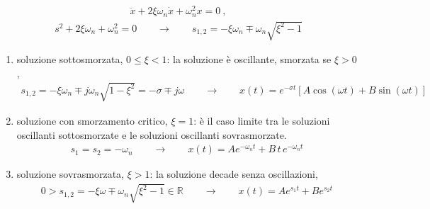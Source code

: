 \documentclass[letterpaper,10pt,italian]{jupyterBook}
\begin{document}
\begin{equation*}
\begin{split}\ddot{x} + 2 \xi \omega_n \dot{x} + \omega_n^2 x = 0 \ ,\end{split}
\end{equation*}\begin{equation*}
\begin{split}s^2 + 2 \xi \omega_n + \omega_n^2 = 0 \qquad \rightarrow \qquad s_{1,2} = -\xi \omega_n \mp \omega_n \sqrt{\xi^2 - 1}\end{split}
\end{equation*}\begin{enumerate}
%
\item {} 
\sphinxAtStartPar
soluzione sotto\sphinxhyphen{}smorzata, \(0 \le \xi < 1\): la soluzione è oscillante, smorzata se \(\xi > 0\),
\begin{equation*}
\begin{split}s_{1,2} = - \xi \omega_n \mp j \omega_n \sqrt{1 - \xi^2} = - \sigma \mp j \omega
   \qquad \rightarrow \qquad
   x(t) = e^{-\sigma t} \left[ A \cos(\omega t) + B \sin(\omega t) \right]\end{split}
\end{equation*}
\item {} 
\sphinxAtStartPar
soluzione con smorzamento critico, \(\xi = 1\): è il caso limite tra le soluzioni oscillanti sotto\sphinxhyphen{}smorzate e le soluzioni oscillanti sovra\sphinxhyphen{}smorzate.
\begin{equation*}
\begin{split}s_1 = s_2 = - \omega_n
   \qquad \rightarrow \qquad
   x(t) = A e^{-\omega_n t} + B \, t \, e^{-\omega_n t}
   \end{split}
\end{equation*}
\item {} 
\sphinxAtStartPar
soluzione sovra\sphinxhyphen{}smorzata, \(\xi > 1\): la soluzione decade senza oscillazioni,
\begin{equation*}
\begin{split}0 > s_{1,2} = - \xi \omega \mp \omega_n \sqrt{\xi^2 - 1} \in \mathbb{R}
   \qquad \rightarrow \qquad
   x(t) = A e^{s_1 t} + B e^{s_2 t}
   \end{split}
\end{equation*}
\end{enumerate}



\sphinxAtStartPar
{}
\end{document}
